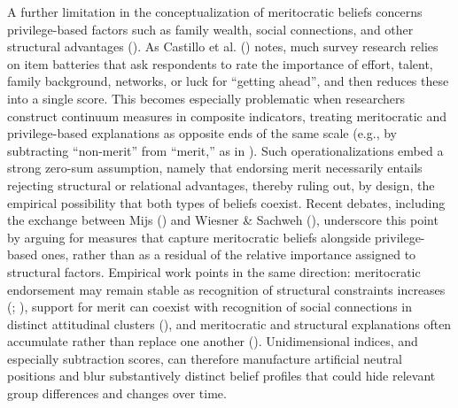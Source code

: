 \documentclass[
  11pt,
]{article}
\begin{document}
A further limitation in the conceptualization of meritocratic beliefs
concerns privilege-based factors such as family wealth, social
connections, and other structural advantages
(). As Castillo
et al. () notes, much
survey research relies on item batteries that ask respondents to rate
the importance of effort, talent, family background, networks, or luck
for ``getting ahead'', and then reduces these into a single score. This
becomes especially problematic when researchers construct continuum
measures in composite indicators, treating meritocratic and
privilege-based explanations as opposite ends of the same scale (e.g.,
by subtracting ``non-merit'' from ``merit,'' as in
). Such
operationalizations embed a strong zero-sum assumption, namely that
endorsing merit necessarily entails rejecting structural or relational
advantages, thereby ruling out, by design, the empirical possibility
that both types of beliefs coexist. Recent debates, including the
exchange between Mijs () and
Wiesner \& Sachweh (),
underscore this point by arguing for measures that capture meritocratic
beliefs alongside privilege-based ones, rather than as a residual of the
relative importance assigned to structural factors. Empirical work
points in the same direction: meritocratic endorsement may remain stable
as recognition of structural constraints increases
(;
), support for
merit can coexist with recognition of social connections in distinct
attitudinal clusters (), and meritocratic and structural explanations often
accumulate rather than replace one another
(). Unidimensional
indices, and especially subtraction scores, can therefore manufacture
artificial neutral positions and blur substantively distinct belief
profiles that could hide relevant group differences and changes over
time.
\end{document}
